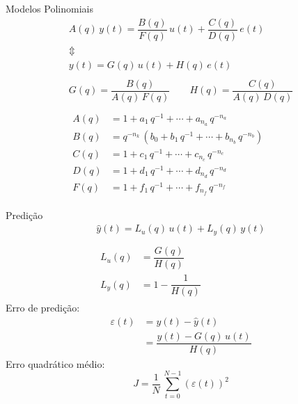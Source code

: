 \documentclass{beamer}
\newcommand{\Prod}{\,}
\renewcommand{\Prod}{\,}
\begin{document}
\begin{frame}{Modelos Polinomiais}
  \begin{gather}
    A(q) \Prod y(t) = \dfrac{B(q)}{F(q)} \Prod u(t) + \dfrac{C(q)}{D(q)} \Prod e(t)
    \\\Updownarrow\\
    y(t) = G(q) \Prod u(t) + H(q) \Prod e(t)
    \\\\
    G(q) = \dfrac{B(q)}{A(q) \Prod F(q)}
    \qquad
    H(q) = \dfrac{C(q)}{A(q) \Prod D(q)}
    \\\\
    \begin{aligned}
      A(q) &= 1 + a_1 \Prod q^{-1} + \dotsb + a_{n_a} \Prod q^{-n_a}
      \\
      B(q) &= q^{-n_k} \Prod \left(b_0 + b_1 \Prod q^{-1} + \dotsb + b_{n_b} \Prod q^{-n_b}\right)
      \\
      C(q) &= 1 + c_1 \Prod q^{-1} + \dotsb + c_{n_c} \Prod q^{-n_c}
      \\
      D(q) &= 1 + d_1 \Prod q^{-1} + \dotsb + d_{n_d} \Prod q^{-n_d}
      \\
      F(q) &= 1 + f_1 \Prod q^{-1} + \dotsb + f_{n_f} \Prod q^{-n_f}
    \end{aligned}
  \end{gather}
\end{frame}

\begin{frame}{Predição}
  \begin{gather}
    \hat{y}(t) = L_u(q) \Prod u(t) + L_y(q) \Prod y(t)
    \\\\
    \begin{aligned}
      L_u(q) &= \dfrac{G(q)}{H(q)}
      \\
      L_y(q) &= 1 - \dfrac{1}{H(q)}
    \end{aligned}
  \end{gather}
  Erro de predição:
  \begin{align}
    \varepsilon(t)
    &= y(t) - \hat{y}(t)
    \\
    &= \dfrac{y(t) - G(q) \Prod u(t)}{H(q)}
  \end{align}
  Erro quadrático médio:
  \begin{equation}
    J = \dfrac{1}{N} \Prod \sum_{t=0}^{N-1}{\left(\varepsilon(t)\right)^2}
  \end{equation}
\end{frame}
\end{document}
